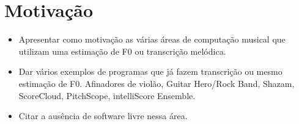 \section{Motivação}
\label{sec:motivacao}

\begin{itemize}
\item Apresentar como motivação as várias áreas de computação musical que utilizam uma estimação de F0 ou transcrição melódica.
\item Dar vários exemplos de programas que já fazem transcrição ou mesmo estimação de F0. Afinadores de violão, Guitar Hero/Rock Band, Shazam, ScoreCloud, PitchScope, intelliScore Ensemble.
\item Citar a ausência de software livre nessa área.
\end{itemize}